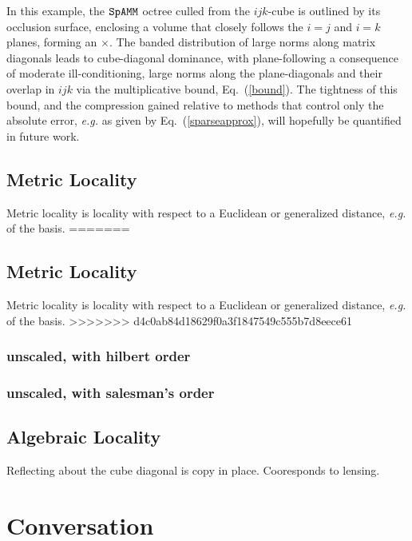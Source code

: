 \documentclass[letterpaper,twocolumn,amsmath,amsfont,amssymb,english,aps,jcp,preprintnumbers,groupaddress,nofootinbib,tightenlines]{revtex4}
\begin{document}
In this example, the $\tt SpAMM$ octree culled from the $ijk$-cube is outlined by its occlusion surface, enclosing 
a volume that closely follows the $i=j$ and $i=k$ planes, forming an $\times$.  The banded distribution
of large norms along  matrix diagonals leads to cube-diagonal dominance, with plane-following 
a consequence of moderate ill-conditioning,  large norms along the plane-diagonals and their overlap in $ijk$
via the multiplicative bound, Eq.~(\ref{bound}). The tightness of this bound, and the compression gained relative
to  methods that control only the absolute error, {\em e.g.} as given by Eq.~(\ref{sparseapprox}), will hopefully
be quantified in future work. 



\subsection{Metric Locality} 
Metric locality is locality with respect to a Euclidean or generalized distance, {\em e.g.} of the basis.  
=======
\subsection{Metric Locality}
Metric locality is locality with respect to a Euclidean or generalized distance, {\em e.g.} of the basis.
>>>>>>> d4c0ab84d18629f0a3f1847549c555b7d8eece61

\subsubsection{unscaled, with hilbert order}

\subsubsection{unscaled, with salesman's order}

\subsection{Algebraic  Locality}

Reflecting about the cube diagonal is copy in place.  Cooresponds to lensing.


\section{Conversation}



\end{document}

